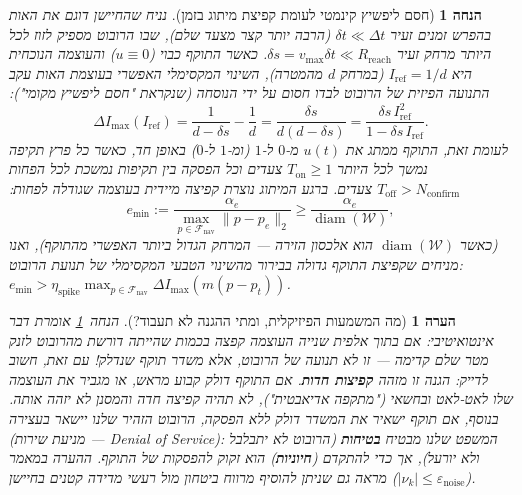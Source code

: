 \documentclass[11pt, a4paper]{article}
\newtheorem{assumption}{הנחה}
\newtheorem{remark}{הערה}
\begin{document}
\begin{assumption}[חסם ליפשיץ קינמטי לעומת קפיצת מיתוג בזמן]
\label{assump:discontinuity}
נניח שהחיישן דוגם את האות בהפרש זמנים זעיר $\delta t \ll \Delta t$ (הרבה יותר קצר מצעד שלם), שבו הרובוט מספיק לזוז לכל היותר מרחק זעיר $\delta s = v_{\max}\delta t \ll R_{\text{reach}}$. כאשר התוקף כבוי ($u \equiv 0$) והעוצמה הנוכחית היא $I_{\text{ref}} = 1/d$ (במרחק $d$ מהמטרה), השינוי המקסימלי האפשרי בעוצמת האות עקב התנועה הפיזית של הרובוט לבדו חסום על ידי הנוסחה (שנקראת "חסם ליפשיץ מקומי"):
\begin{equation}
    \Delta I_{\max}(I_{\text{ref}}) = \frac{1}{d - \delta s} - \frac{1}{d} = \frac{\delta s}{d(d - \delta s)} = \frac{\delta s\, I_{\text{ref}}^2}{1 - \delta s\, I_{\text{ref}}}.
    \label{eq:lipschitz}
\end{equation}
לעומת זאת, התוקף ממתג את $u(t)$ מ-$0$ ל-$1$ (ומ-$1$ ל-$0$) באופן חד, כאשר כל פרץ תקיפה נמשך לכל היותר $T_{\text{on}} \ge 1$ צעדים וכל הפסקה בין תקיפות נמשכת לכל הפחות $T_{\text{off}} > N_{\text{confirm}}$ צעדים. ברגע המיתוג נוצרת קפיצה מיידית בעוצמה שגודלה לפחות:
\begin{equation}
    e_{\min} := \frac{\alpha_e}{\max_{p \in \mathcal{F}_{\text{nav}}} \|p - p_e\|_2} \ge \frac{\alpha_e}{\operatorname{diam}(\mathcal{W})},
    \label{eq:emin_short}
\end{equation}
(כאשר $\operatorname{diam}(\mathcal{W})$ הוא אלכסון הזירה — המרחק הגדול ביותר האפשרי מהתוקף), ואנו מניחים שקפיצת התוקף גדולה בבירור מהשינוי הטבעי המקסימלי של תנועת הרובוט: $e_{\min} > \eta_{\text{spike}} \max_{p \in \mathcal{F}_{\text{nav}}} \Delta I_{\max}(m(p-p_t))$.
\end{assumption}

\begin{remark}[מה המשמעות הפיזיקלית, ומתי ההגנה לא תעבוד?]
הנחה~\ref{assump:discontinuity} אומרת דבר אינטואיטיבי: אם בתוך אלפית שנייה העוצמה קפצה בכמות שהייתה דורשת מהרובוט לזנק מטר שלם קדימה — זו לא תנועה של הרובוט, אלא משדר תוקף שנדלק! עם זאת, חשוב לדייק: הגנה זו מזהה \textbf{קפיצות חדות}. אם התוקף דולק קבוע מראש, או מגביר את העוצמה שלו לאט-לאט ובחשאי ("מתקפה אדיאבטית"), לא תהיה קפיצה חדה והמסנן לא יזהה אותה. בנוסף, אם תוקף ישאיר את המשדר דולק ללא הפסקה, הרובוט הזהיר שלנו יישאר בעצירה (מניעת שירות — \foreignlanguage{english}{Denial of Service}): המשפט שלנו מבטיח \textbf{בטיחות} (הרובוט לא יתבלבל ולא יורעל), אך כדי להתקדם (\textbf{חיוניות}) הוא זקוק להפסקות של התוקף. ההערה במאמר מראה גם שניתן להוסיף מרווח ביטחון מול רעשי מדידה קטנים בחיישן ($|\nu_k| \le \varepsilon_{\text{noise}}$).
\end{remark}
\end{document}
